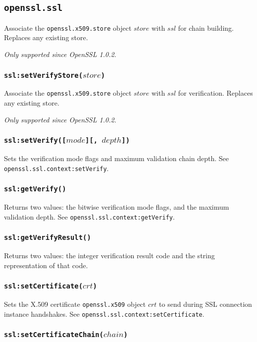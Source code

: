\documentclass[11pt, oneside]{memoir}
\newcommand*{\fn}[1]{\texttt{#1}\xspace}
\newcommand*{\module}[1]{\texttt{#1}\xspace}
\newcounter{toccols}
\newenvironment{Module}[1]{
	\subsection{\texttt{#1}}
	\addtocontents{toc}{
		\protect\begin{multicols}{\value{toccols}}
	}
}{
	\addtocontents{toc}{\protect\end{multicols}}
}
\begin{document}
\begin{Module}{openssl.ssl}
Associate the \module{openssl.x509.store} object $store$ with $ssl$ for chain building. Replaces any existing store.

\emph{Only supported since OpenSSL 1.0.2.}

\subsubsection[\fn{ssl:setVerifyStore}]{\fn{ssl:setVerifyStore($store$)}}

Associate the \module{openssl.x509.store} object $store$ with $ssl$ for verification. Replaces any existing store.

\emph{Only supported since OpenSSL 1.0.2.}

\subsubsection[\fn{ssl:setVerify}]{\fn{ssl:setVerify([$mode$][, $depth$])}}

Sets the verification mode flags and maximum validation chain depth.
See \fn{openssl.ssl.context:setVerify}.

\subsubsection[\fn{ssl:getVerify}]{\fn{ssl:getVerify()}}

Returns two values: the bitwise verification mode flags, and the maximum validation depth.
See \fn{openssl.ssl.context:getVerify}.

\subsubsection[\fn{ssl:getVerifyResult}]{\fn{ssl:getVerifyResult()}}

Returns two values: the integer verification result code and the string representation of that code.

\subsubsection[\fn{ssl:setCertificate}]{\fn{ssl:setCertificate($crt$)}}

Sets the X.509 certificate \module{openssl.x509} object $crt$ to send during SSL connection instance handshakes.
See \fn{openssl.ssl.context:setCertificate}.

\subsubsection[\fn{ssl:setCertificateChain}]{\fn{ssl:setCertificateChain($chain$)}}


\end{Module}
\end{document}
